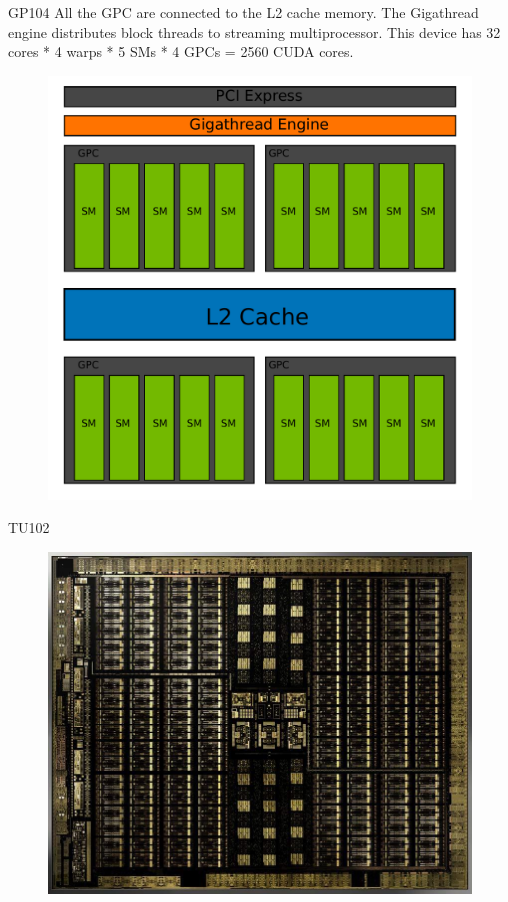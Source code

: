 \documentclass{beamer}
\begin{document}
\begin{frame}{GP104}
	All the GPC are connected to the L2 cache memory. The Gigathread engine distributes block threads to streaming multiprocessor. This device has 32 cores * 4 warps * 5 SMs * 4 GPCs = 2560 CUDA cores.
	\begin{figure}
		\includegraphics[scale=0.3]{figures/gp104.pdf}
	\end{figure}
\end{frame}

\begin{frame}{TU102}
	\begin{figure}
		\includegraphics[scale=0.3]{figures/TU102.jpg}
	\end{figure}
\end{frame}
\end{document}
